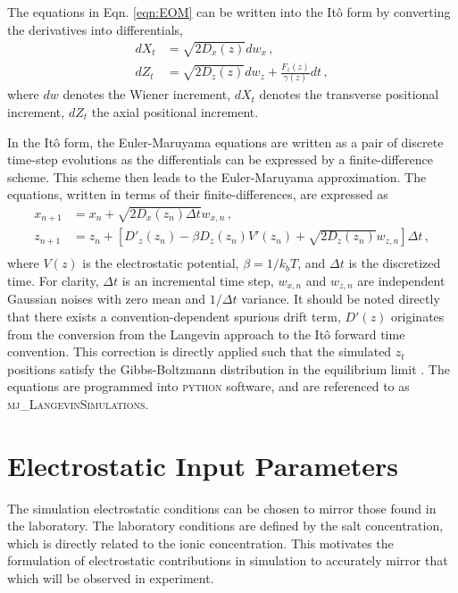 The equations in Eqn. \ref{eqn:EOM} can be written into the Itô form by converting the derivatives into differentials,
\begin{equation}
    \begin{aligned}
        dX_t &= \sqrt{2D_x(z)} dw_x \,,\\
        dZ_t &= \sqrt{2D_z(z)} dw_z + \frac{F_z(z)}{\gamma(z)} dt\,,
    \end{aligned}
\end{equation}
where $dw$ denotes the Wiener increment, $dX_t$ denotes the transverse positional increment, $dZ_t$ the axial positional increment.

In the Itô form, the Euler-Maruyama equations are written as a pair of discrete time-step evolutions as the differentials can be expressed by a finite-difference scheme. This scheme then leads to the Euler-Maruyama approximation. The equations, written in terms of their finite-differences, are expressed as
\begin{equation}
    \begin{aligned}
        x_{n+1} &= x_n + \sqrt{2D_x(z_n)\Delta t} w_{x,n}\,,\\
        z_{n+1} &= z_n + \left[D'_z(z_n) - \beta D_z(z_n) V'(z_n) + \sqrt{2D_z(z_n)} w_{z,n}\right]\Delta t\,,\\
    \end{aligned}
\end{equation}
where $V(z)$ is the electrostatic potential, $\beta = 1/k_b T$, and $\Delta t$ is the discretized time. For clarity, $\Delta t$ is an incremental time step, $w_{x,n}$ and $w_{z,n}$ are independent Gaussian noises with zero mean and $1/\Delta t$ variance. It should be noted directly that there exists a convention-dependent spurious drift term, $D'(z)$ originates from the conversion from the Langevin approach to the Itô forward time convention. This correction is directly applied such that the simulated $z_t$ positions satisfy the Gibbs-Boltzmann distribution in the equilibrium limit \cite{millanNumericalSimulationsConfined2023}. The equations are programmed into \textsc{python} software, and are referenced to as \textsc{mj\_LangevinSimulations}. 

\clearpage
\section{Electrostatic Input Parameters}

The simulation electrostatic conditions can be chosen to mirror those found in the laboratory. The laboratory conditions are defined by the salt concentration, which is directly related to the ionic concentration. This motivates the formulation of electrostatic contributions in simulation to accurately mirror that which will be observed in experiment. 

